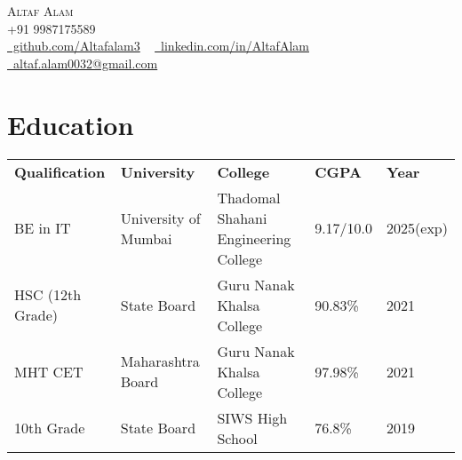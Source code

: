 \documentclass[letterpaper,11pt]{article}
\begin{document}

\begin{center}
    {\huge \scshape Altaf Alam} \\ 
    \vspace{4pt}
    {\scshape +91 9987175589} \\ 
    \vspace{4pt}
    \small
    \faGithub \href{https://github.com/Altafalam3}{\raisebox{-0.2\height}\ github.com/Altafalam3} ~
    \faLinkedin \href{https://linkedin.com/in/altaf-alam-432849234}{\raisebox{-0.2\height}\ linkedin.com/in/AltafAlam} ~
    \faEnvelope \href{mailto:contact@altaf.alam0032@gmail.com}{\raisebox{-0.2\height}\  altaf.alam0032@gmail.com}
    \vspace{1pt}
\end{center}


\section{Education}
    \vspace{-4pt}
    \begin{itemize}[leftmargin=0.2in, label={}]
        {\item{
            \begin{tabular}{ l@{\hskip 0.2in} l@{\hskip 0.2in} l@{\hskip 0.2in} l@{\hskip 0.2in} l }
                 \textbf{Qualification} & \textbf{University} & \textbf{College} & \textbf{CGPA} & \textbf{Year} \\
                 BE in IT & University of Mumbai & Thadomal Shahani Engineering College & 9.17/10.0 & 2025(exp)  \\
                 HSC (12th Grade) & State Board & Guru Nanak Khalsa College & 90.83\% & 2021 \\
                 MHT CET & Maharashtra Board & Guru Nanak Khalsa College & 97.98\% & 2021 \\
                 10th Grade & State Board & SIWS High School & 76.8\% & 2019
            \end{tabular}
        }}
    \end{itemize}
\vspace{-10pt}
\end{document}
